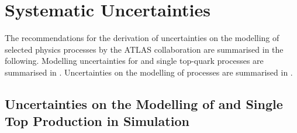 \clearpage
\section{Systematic Uncertainties}

The recommendations for the derivation of uncertainties on the modelling of
selected physics processes by the ATLAS collaboration are summarised in the
following. Modelling uncertainties for \ttbar and single top-quark processes are
summarised in . Uncertainties on the modelling of
\Zjets processes are summarised in .



\subsection{Uncertainties on the Modelling of \ttbar and Single Top Production
  in Simulation}%
\label{app:top_uncertainties}

